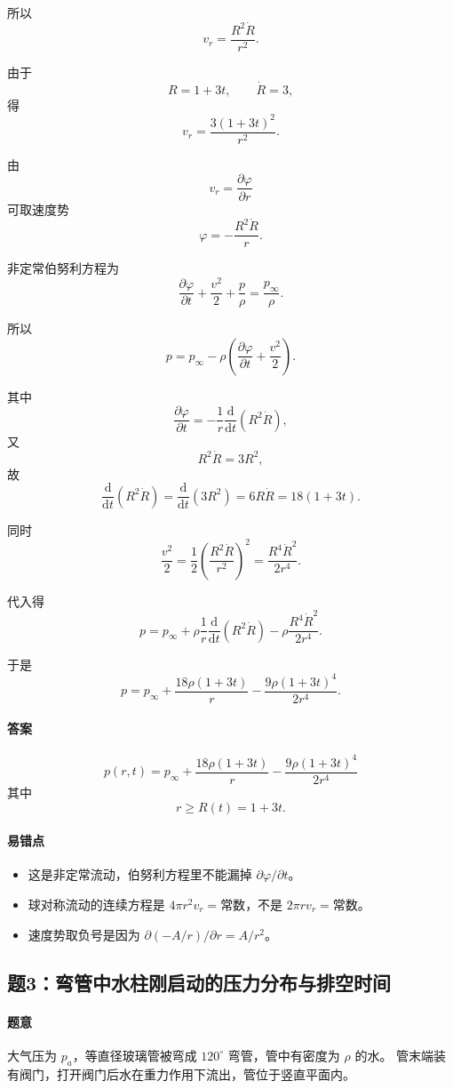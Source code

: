 ﻿\documentclass[12pt,a4paper]{ctexart}
\newcommand{\dd}{\mathrm d}
\newcommand{\pa}{p_a}
\newcommand{\pinf}{p_\infty}
\begin{document}
所以
\[
v_r=\frac{R^2\dot R}{r^2}.
\]

由于
\[
R=1+3t,\qquad \dot R=3,
\]
得
\[
v_r=\frac{3(1+3t)^2}{r^2}.
\]

由
\[
v_r=\frac{\partial\varphi}{\partial r}
\]
可取速度势
\[
\varphi=-\frac{R^2\dot R}{r}.
\]

非定常伯努利方程为
\[
\frac{\partial \varphi}{\partial t}
+\frac{v^2}{2}
+\frac p\rho
=\frac{\pinf}{\rho}.
\]

所以
\[
p=\pinf-\rho
\left(
\frac{\partial \varphi}{\partial t}
+\frac{v^2}{2}
\right).
\]

其中
\[
\frac{\partial \varphi}{\partial t}
=-\frac{1}{r}\frac{\dd}{\dd t}(R^2\dot R),
\]
又
\[
R^2\dot R=3R^2,
\]
故
\[
\frac{\dd}{\dd t}(R^2\dot R)
=\frac{\dd}{\dd t}(3R^2)
=6R\dot R
=18(1+3t).
\]

同时
\[
\frac{v^2}{2}
=\frac12\left(\frac{R^2\dot R}{r^2}\right)^2
=\frac{R^4\dot R^2}{2r^4}.
\]

代入得
\[
p=\pinf
+\rho\frac{1}{r}\frac{\dd}{\dd t}(R^2\dot R)
-\rho\frac{R^4\dot R^2}{2r^4}.
\]

于是
\[
p
=\pinf
+\frac{18\rho(1+3t)}{r}
-\frac{9\rho(1+3t)^4}{2r^4}.
\]

\paragraph{答案}
\[
\boxed{
p(r,t)=
\pinf
+\frac{18\rho(1+3t)}{r}
-\frac{9\rho(1+3t)^4}{2r^4}
}
\]
其中
\[
r\ge R(t)=1+3t.
\]

\paragraph{易错点}
\begin{itemize}
  \item 这是非定常流动，伯努利方程里不能漏掉 $\partial\varphi/\partial t$。
  \item 球对称流动的连续方程是 $4\pi r^2 v_r=\text{常数}$，不是 $2\pi r v_r=\text{常数}$。
  \item 速度势取负号是因为 $\partial(-A/r)/\partial r=A/r^2$。
\end{itemize}

\subsection*{题3：弯管中水柱刚启动的压力分布与排空时间}

\paragraph{题意}
大气压为 $\pa$，等直径玻璃管被弯成 $120^\circ$ 弯管，管中有密度为 $\rho$ 的水。
管末端装有阀门，打开阀门后水在重力作用下流出，管位于竖直平面内。
\end{document}
